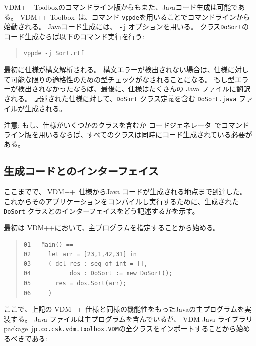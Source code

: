 \documentclass[\pformat,11pt]{jarticle}
\newcommand{\ToolboxName}{VDM++ Toolbox}
\newcommand{\vdmde}{vppde}
\newcommand{\Tcg}{コードジェネレータ}
\newcommand{\VDM}{VDM++}
\newcommand{\JL}{VDM Java ライブラリ}
\begin{document}
 \ToolboxName のコマンドライン版からもまた、Javaコード生成は可能である。
 \ToolboxName\ は、コマンド {\tt \vdmde}を用いることでコマンドラインから始動される。
Javaコード生成には、 {\tt -j} オプションを用いる。
クラス{\tt DoSort}のコード生成ならば以下のコマンド実行を行う:

\begin{quote}
\begin{verbatim}
vppde -j Sort.rtf
\end{verbatim}
\end{quote}

最初に仕様が構文解析される。
構文エラーが検出されない場合は、仕様に対して可能な限りの適格性のための型チェックがなされることになる。
もし型エラーが検出されなかったならば、最後に、仕様はたくさんの Java ファイルに翻訳される。
記述された仕様に対して、{\tt DoSort} クラス定義を含む {\tt DoSort.java} ファイルが生成される。

注意: もし、仕様がいくつかのクラスを含むか \Tcg\ でコマンドライン版を用いるならば、すべてのクラスは同時にコード生成されている必要がある。


\subsection{生成コードとのインターフェイス}\label{interfacinggettingstarted}

ここまでで、 \VDM\ 仕様からJava コードが生成される地点まで到達した。
これからそのアプリケーションをコンパイルし実行するために、生成された {\tt DoSort} クラスとのインターフェイスをどう記述するかを示す。

\newpage
最初は \VDM{}において、主プログラムを指定することから始める。

\begin{quote}
\begin{verbatim}
01   Main() ==
02     let arr = [23,1,42,31] in
03     ( dcl res : seq of int = [],
04           dos : DoSort := new DoSort();
05       res = dos.Sort(arr);
06     )
\end{verbatim}
\end{quote}

ここで、上記の \VDM\ 仕様と同様の機能性をもったJavaの主プログラムを実装する。
 Java ファイルは主プログラムを含んでいるが、 \JL{} package {\tt jp.co.csk.vdm.toolbox.VDM}の全クラスをインポートすることから始めるべきである:
\end{document}

